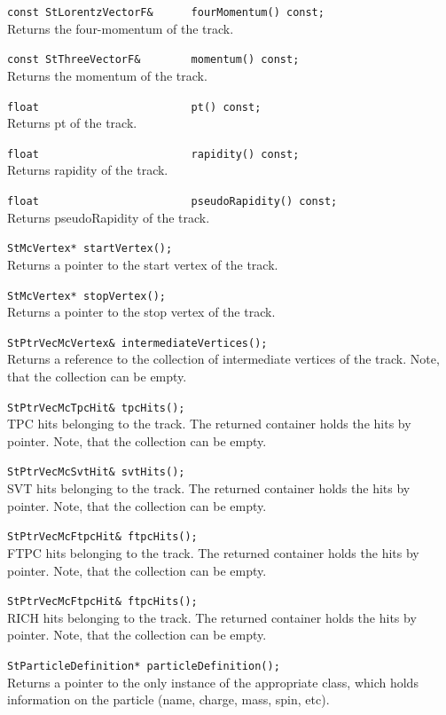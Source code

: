 \begin{Entry}
    \verb+const StLorentzVectorF&      fourMomentum() const;+\\
    Returns the four-momentum of the track.

    \verb+const StThreeVectorF&        momentum() const;+\\
    Returns the momentum of the track.

    \verb+float                        pt() const;+\\
    Returns pt of the track.

    \verb+float                        rapidity() const;+\\
    Returns rapidity of the track.

    \verb+float                        pseudoRapidity() const;+\\
    Returns pseudoRapidity of the track.

    \verb+StMcVertex* startVertex();+\\
    Returns a pointer to the start vertex of the track.

    \verb+StMcVertex* stopVertex();+\\
    Returns a pointer to the stop vertex of the track.

    \verb+StPtrVecMcVertex& intermediateVertices();+\\
    Returns a reference to the collection of intermediate vertices of the track.
    Note, that the collection can be empty.

    \verb+StPtrVecMcTpcHit& tpcHits();+\\
    TPC hits belonging to the track.
    The returned container holds the
    hits by pointer. Note, that the collection can be empty.

    \verb+StPtrVecMcSvtHit& svtHits();+\\
    SVT hits belonging to the track.
    The returned container holds the
    hits by pointer. Note, that the collection can be empty.

    \verb+StPtrVecMcFtpcHit& ftpcHits();+\\
    FTPC hits belonging to the track.
    The returned container holds the
    hits by pointer. Note, that the collection can be empty.

    \verb+StPtrVecMcFtpcHit& ftpcHits();+\\
    RICH hits belonging to the track.
    The returned container holds the
    hits by pointer. Note, that the collection can be empty.

    \verb+StParticleDefinition* particleDefinition();+\\
    Returns a pointer to the only instance of the appropriate
     class, which holds
    information on the particle (name, charge, mass, spin, etc).


\end{Entry}
